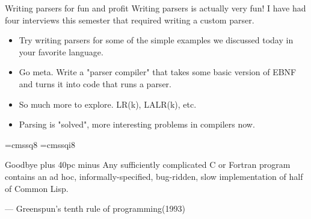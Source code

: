 \documentclass[aspectratio=169]{beamer}
\begin{document}
\begin{frame}{Writing parsers for fun and profit}
    Writing parsers is actually very fun! I have had four interviews this semester that required writing a custom parser. 
    \begin{itemize}
        \item Try writing parsers for some of the simple examples we discussed today in your favorite language. 
        \item Go meta. Write a "parser compiler" that takes some basic version of EBNF and turns it into code that runs a parser. 
        \item So much more to explore. LR(k), LALR(k), etc.
        \item Parsing is "solved", more interesting problems in compilers now.  
    \end{itemize}
\end{frame}

\font\eightss=cmssq8
\font\eightssi=cmssqi8
\newcommand\quoteAuthorDate[3]{\begingroup
  \baselineskip 10pt
  \parfillskip 0pt
  \interlinepenalty 10000 %
  \leftskip 0pt plus 40pc minus \parindent
  \let\rm=\eightss
  \let\sl=\eightssi
  \everypar{\sl}#1\par
  \nobreak\smallskip
  \noindent\rm--- #2\unskip\enspace(#3)\par
  \endgroup}

\begin{frame}{Goodbye}
    \centering
    \quoteAuthorDate{Any sufficiently complicated C or Fortran program contains an ad hoc, informally-specified, bug-ridden, slow implementation of half of Common Lisp.}{Greenspun's tenth rule of programming}{1993}
\end{frame}
\end{document}
